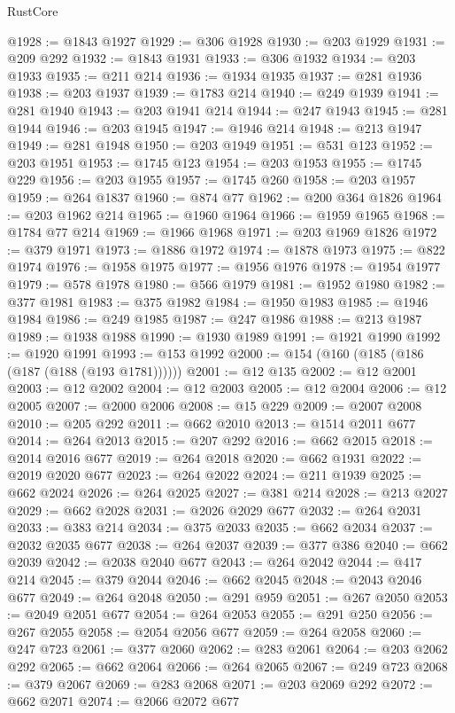 \begin{lexlean}{RustCore}
\begin{coremodule}
@1928 := @1843 @1927
@1929 := @306 @1928
@1930 := @203 @1929
@1931 := @209 @292
@1932 := @1843 @1931
@1933 := @306 @1932
@1934 := @203 @1933
@1935 := @211 @214
@1936 := @1934 @1935
@1937 := @281 @1936
@1938 := @203 @1937
@1939 := @1783 @214
@1940 := @249 @1939
@1941 := @281 @1940
@1943 := @203 @1941 @214
@1944 := @247 @1943
@1945 := @281 @1944
@1946 := @203 @1945
@1947 := @1946 @214
@1948 := @213 @1947
@1949 := @281 @1948
@1950 := @203 @1949
@1951 := @531 @123
@1952 := @203 @1951
@1953 := @1745 @123
@1954 := @203 @1953
@1955 := @1745 @229
@1956 := @203 @1955
@1957 := @1745 @260
@1958 := @203 @1957
@1959 := @264 @1837
@1960 := @874 @77
@1962 := @200 @364 @1826
@1964 := @203 @1962 @214
@1965 := @1960 @1964
@1966 := @1959 @1965
@1968 := @1784 @77 @214
@1969 := @1966 @1968
@1971 := @203 @1969 @1826
@1972 := @379 @1971
@1973 := @1886 @1972
@1974 := @1878 @1973
@1975 := @822 @1974
@1976 := @1958 @1975
@1977 := @1956 @1976
@1978 := @1954 @1977
@1979 := @578 @1978
@1980 := @566 @1979
@1981 := @1952 @1980
@1982 := @377 @1981
@1983 := @375 @1982
@1984 := @1950 @1983
@1985 := @1946 @1984
@1986 := @249 @1985
@1987 := @247 @1986
@1988 := @213 @1987
@1989 := @1938 @1988
@1990 := @1930 @1989
@1991 := @1921 @1990
@1992 := @1920 @1991
@1993 := @153 @1992
@2000 := @154 (@160 (@185 (@186 (@187 (@188 (@193 @1781))))))
@2001 := @12 @135
@2002 := @12 @2001
@2003 := @12 @2002
@2004 := @12 @2003
@2005 := @12 @2004
@2006 := @12 @2005
@2007 := @2000 @2006
@2008 := @15 @229
@2009 := @2007 @2008
@2010 := @205 @292
@2011 := @662 @2010
@2013 := @1514 @2011 @677
@2014 := @264 @2013
@2015 := @207 @292
@2016 := @662 @2015
@2018 := @2014 @2016 @677
@2019 := @264 @2018
@2020 := @662 @1931
@2022 := @2019 @2020 @677
@2023 := @264 @2022
@2024 := @211 @1939
@2025 := @662 @2024
@2026 := @264 @2025
@2027 := @381 @214
@2028 := @213 @2027
@2029 := @662 @2028
@2031 := @2026 @2029 @677
@2032 := @264 @2031
@2033 := @383 @214
@2034 := @375 @2033
@2035 := @662 @2034
@2037 := @2032 @2035 @677
@2038 := @264 @2037
@2039 := @377 @386
@2040 := @662 @2039
@2042 := @2038 @2040 @677
@2043 := @264 @2042
@2044 := @417 @214
@2045 := @379 @2044
@2046 := @662 @2045
@2048 := @2043 @2046 @677
@2049 := @264 @2048
@2050 := @291 @959
@2051 := @267 @2050
@2053 := @2049 @2051 @677
@2054 := @264 @2053
@2055 := @291 @250
@2056 := @267 @2055
@2058 := @2054 @2056 @677
@2059 := @264 @2058
@2060 := @247 @723
@2061 := @377 @2060
@2062 := @283 @2061
@2064 := @203 @2062 @292
@2065 := @662 @2064
@2066 := @264 @2065
@2067 := @249 @723
@2068 := @379 @2067
@2069 := @283 @2068
@2071 := @203 @2069 @292
@2072 := @662 @2071
@2074 := @2066 @2072 @677

\end{coremodule}
\end{lexlean}
